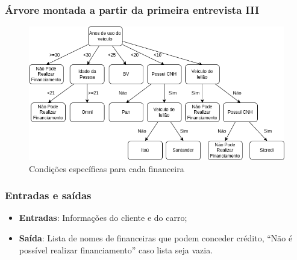 \documentclass[12pt]{beamer}
\begin{document}
\begin{frame}
    \frametitle{Árvore montada a partir da primeira entrevista III}
    \begin{figure}
        \centering
        \includegraphics[height=.66\textheight]{condicoes_financeieras_2.png}
        \caption{Condições específicas para cada financeira}
    \end{figure} 
\end{frame}

\begin{frame}
    \frametitle{Entradas e saídas}
    \begin{itemize}
        \item\textbf{Entradas}: Informações do cliente e do carro;
        \item\textbf{Saída}: Lista de nomes de financeiras que podem conceder crédito, ``Não é possível realizar financiamento'' caso lista seja vazia.
    \end{itemize}
\end{frame}
\end{document}
